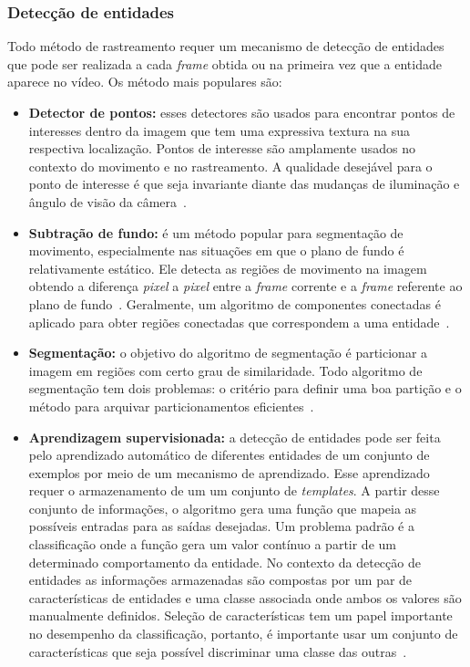 \subsubsection{Detecção de entidades}
\label{sec:deteccao-objeto}

	Todo método de rastreamento requer um mecanismo de detecção de entidades que pode ser realizada a cada \textit{frame} obtida ou na primeira vez que a entidade aparece no vídeo. Os método mais populares são:


	\begin{itemize}
		\item \textbf{Detector de pontos:} esses detectores são usados para encontrar pontos de interesses dentro da imagem que tem uma expressiva textura na sua respectiva localização. Pontos de interesse são amplamente usados no contexto do movimento e no rastreamento. A qualidade desejável para o ponto de interesse é que seja invariante diante das mudanças de iluminação e ângulo de visão da câmera~\cite{yilmaz}.
	
		\item \textbf{Subtração de fundo:} é um método popular para segmentação de movimento, especialmente nas situações em que o plano de fundo é relativamente estático. Ele detecta as regiões de movimento na imagem obtendo a diferença \textit{pixel} a \textit{pixel} entre a \textit{frame} corrente e a \textit{frame} referente ao plano de fundo~\cite{weiming}. Geralmente, um algoritmo de componentes conectadas é aplicado para obter regiões conectadas que correspondem a uma entidade~\cite{yilmaz}.

		\item \textbf{Segmentação:} o objetivo do algoritmo de segmentação é particionar a imagem em regiões com certo grau de similaridade. Todo algoritmo de segmentação tem dois problemas: o critério para definir uma boa partição e o método para arquivar particionamentos eficientes~\cite{yilmaz, shi}.

		\item \textbf{Aprendizagem supervisionada:} a detecção de entidades pode ser feita pelo aprendizado automático de diferentes entidades de um conjunto de exemplos por meio de um mecanismo de aprendizado. Esse aprendizado requer o armazenamento de um um conjunto de \textit{templates}. A partir desse conjunto de informações, o algoritmo gera uma função que mapeia as possíveis entradas para as saídas desejadas. Um problema padrão é a classificação onde a função gera um valor contínuo a partir de um determinado comportamento da entidade. No contexto da detecção de entidades as informações armazenadas são compostas por um par de características de entidades e uma classe associada onde ambos os valores são manualmente definidos. Seleção de características tem um papel importante no desempenho da classificação, portanto, é importante usar um conjunto de características que seja possível discriminar uma classe das outras~\cite{yilmaz}.
	\end{itemize}

